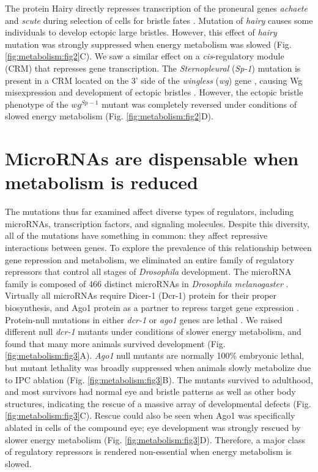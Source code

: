 The protein Hairy directly represses transcription of the proneural genes \textit{achaete} and \textit{scute} during selection of cells for bristle fates \cite{Van1994}. Mutation of \textit{hairy} causes some individuals to develop ectopic large bristles. However, this effect of \textit{hairy} mutation was strongly suppressed when energy metabolism was slowed (Fig. \ref{fig:metabolism:fig2}C). We saw a similar effect on a \textit{cis}-regulatory module (CRM) that represses gene transcription. The \textit{Sternopleural} (\textit{Sp-1}) mutation is present in a CRM located on the 3' side of the \textit{wingless} (\textit{wg}) gene \cite{Neumann1996}, causing Wg misexpression and development of ectopic bristles \cite{Neumann1996}. However, the ectopic bristle phenotype of the $wg^{Sp-1}$ mutant was completely reversed under conditions of slowed energy metabolism (Fig. \ref{fig:metabolism:fig2}D).

\section{MicroRNAs are dispensable when metabolism is reduced}

The mutations thus far examined affect diverse types of regulators, including microRNAs, transcription factors, and signaling molecules. Despite this diversity, all of the mutations have something in common: they affect repressive interactions between genes. To explore the prevalence of this relationship between gene repression and metabolism, we eliminated an entire family of regulatory repressors that control all stages of \textit{Drosophila} development. The microRNA family is composed of 466 distinct microRNAs in \textit{Drosophila melanogaster} \cite{Kozomara2014}. Virtually all microRNAs require Dicer-1 (Dcr-1) protein for their proper biosynthesis, and Ago1 protein as a partner to repress target gene expression \cite{Carthew2009}. Protein-null mutations in either \textit{dcr-1} or \textit{ago1} genes are lethal \cite{Pressman2012}. We raised different null \textit{dcr-1} mutants under conditions of slower energy metabolism, and found that many more animals survived development (Fig. \ref{fig:metabolism:fig3}A). \textit{Ago1} null mutants are normally 100\% embryonic lethal, but mutant lethality was broadly suppressed when animals slowly metabolize due to IPC ablation (Fig. \ref{fig:metabolism:fig3}B). The mutants survived to adulthood, and most survivors had normal eye and bristle patterns as well as other body structures, indicating the rescue of a massive array of developmental defects (Fig. \ref{fig:metabolism:fig3}C). Rescue could also be seen when Ago1 was specifically ablated in cells of the compound eye; eye development was strongly rescued by slower energy metabolism (Fig. \ref{fig:metabolism:fig3}D). Therefore, a major class of regulatory repressors is rendered non-essential when energy metabolism is slowed.

